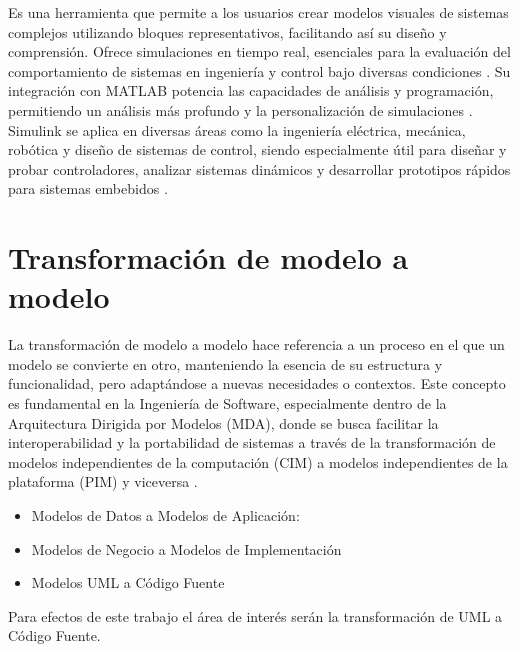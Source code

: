 Es una herramienta que permite a los usuarios crear modelos visuales de sistemas complejos utilizando bloques representativos, facilitando así su diseño y comprensión. Ofrece simulaciones en tiempo real, esenciales para la evaluación del comportamiento de sistemas en ingeniería y control bajo diversas condiciones \cite{PealozaLuna2022SimulacinDU}. Su integración con MATLAB potencia las capacidades de análisis y programación, permitiendo un análisis más profundo y la personalización de simulaciones \cite{Daza2021PlataformaDP}. Simulink se aplica en diversas áreas como la ingeniería eléctrica, mecánica, robótica y diseño de sistemas de control, siendo especialmente útil para diseñar y probar controladores, analizar sistemas dinámicos y desarrollar prototipos rápidos para sistemas embebidos \cite{CardozoSarmiento2019SimulationOI}.

\section{Transformación de modelo a modelo}\label{sec:modelo2model}

La transformación de modelo a modelo hace referencia a un proceso en el que un modelo se convierte en otro, manteniendo la esencia de su estructura y funcionalidad, pero adaptándose a nuevas necesidades o contextos. Este concepto es fundamental en la Ingeniería de Software, especialmente dentro de la Arquitectura Dirigida por Modelos (MDA), donde se busca facilitar la interoperabilidad y la portabilidad de sistemas a través de la transformación de modelos independientes de la computación (CIM) a modelos independientes de la plataforma (PIM) y viceversa \cite{kusel2015reuse} \cite{varro2006model}.

\begin{itemize}
    \item Modelos de Datos a Modelos de Aplicación:
    \item Modelos de Negocio a Modelos de Implementación
    \item Modelos UML a Código Fuente
\end{itemize}

Para efectos de este trabajo el área de interés serán la transformación de UML a Código Fuente.

%

